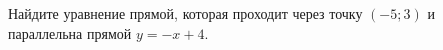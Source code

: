 \begin{ex}
	\begin{condition}
		Найдите уравнение прямой, которая проходит через точку \( (-5;3) \) и параллельна прямой \( y=-x+4 \).
	\end{condition}
\end{ex}